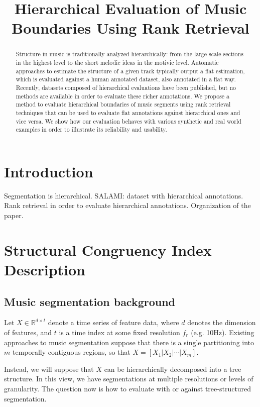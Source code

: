 \documentclass{article}
\title{Hierarchical Evaluation of Music Boundaries Using Rank Retrieval}
\begin{document}
%
\maketitle
%
\begin{abstract}
  Structure in music is traditionally analyzed hierarchically: from the large scale sections in the highest level to the short melodic ideas in the motivic level. 
  Automatic approaches to estimate the structure of a given track typically output a flat estimation, which is evaluated against a human annotated dataset, also annotated in a flat way.
  Recently, datasets composed of hierarchical evaluations have been published, but no methods are available in order to evaluate these richer annotations.
  We propose a method to evaluate hierarchical boundaries of music segments using rank retrieval techniques that can be used to evaluate flat annotations against hierarchical ones and vice versa.
  We show how our evaluation behaves with various synthetic and real world examples in order to illustrate its reliability and usability. 
\end{abstract}
%
\section{Introduction}\label{sec:introduction}

Segmentation is hierarchical.
SALAMI: dataset with hierarchical annotations.
Rank retrieval in order to evaluate hierarchical annotations.
Organization of the paper.

\section{Structural Congruency Index Description}\label{sec:eval_desc}

\subsection{Music segmentation background}

Let $X \in \mathbb{R}^{d\times t}$ denote a time series of feature data, where $d$ denotes the dimension of features, and $t$ is a time index at some fixed resolution $f_r$ (e.g. 10Hz).
Existing approaches to music segmentation suppose that there is a single partitioning into $m$ temporally contiguous regions, so that $X=[X_1|X_2|\cdots|X_m]$.

Instead, we will suppose that $X$ can be hierarchically decomposed into a tree structure.
In this view, we have segmentations at multiple resolutions or levels of granularity.
The question now is how to evaluate with or against tree-structured segmentation.
\end{document}
